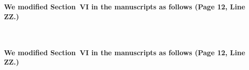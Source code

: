 \documentclass[onecolumn]{IEEEconf}
\begin{document}
\begin{description}
\begin{mdframed}[ linewidth=.75pt, userdefinedwidth=0.9\textwidth]
    \end{mdframed} 
    ~\\
	~\\
	\textbf{We modified Section~VI in the manuscripts as follows (Page 12, Line ZZ.)}\\
    \begin{mdframed}[ linewidth=.75pt, userdefinedwidth=0.9\textwidth]

    \end{mdframed} 
    ~\\
	~\\
	\textbf{We modified Section~VI in the manuscripts as follows (Page 12, Line ZZ.)}\\
    \begin{mdframed}[ linewidth=.75pt, userdefinedwidth=0.9\textwidth]

    \end{mdframed} 
	~\\
    ~\\
\end{description}
\end{document}
